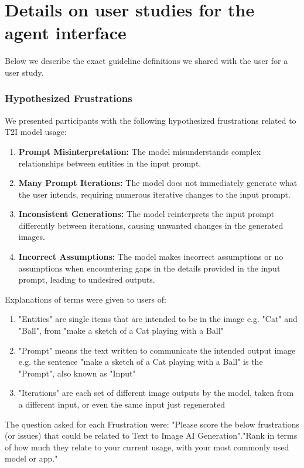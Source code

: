 \section{Details on user studies for the agent interface}
\label{user_study}
Below we describe the exact guideline definitions we shared with the user for a user study.

\subsubsection{Hypothesized Frustrations}
We presented participants with the following hypothesized frustrations related to T2I model usage:
\begin{enumerate}
\item \textbf{Prompt Misinterpretation:} The model misunderstands complex relationships between entities in the input prompt.
\item \textbf{Many Prompt Iterations:} The model does not immediately generate what the user intends, requiring numerous iterative changes to the input prompt.
\item \textbf{Inconsistent Generations:} The model reinterprets the input prompt differently between iterations, causing unwanted changes in the generated images.
\item \textbf{Incorrect Assumptions:} The model makes incorrect assumptions or no assumptions when encountering gaps in the details provided in the input prompt, leading to undesired outputs.
\end{enumerate}

Explanations of terms were given to users of: 
\begin{enumerate}
\item "Entities" are single items that are intended to be in the image e.g. "Cat" and "Ball", from "make a sketch of a Cat playing with a Ball"
\item "Prompt" means the text written to communicate the intended output image e.g. the sentence "make a sketch of a Cat playing with a Ball" is the "Prompt", also known as "Input" 
\item "Iterations" are each set of different image outputs by the model, taken from a different input, or even the same input just regenerated
\end{enumerate}

The question asked for each Frustration were: "Please score the below frustrations (or issues) that could be related to Text to Image AI Generation"."Rank in terms of how much they relate to your current usage, with your most commonly used model or app." 





